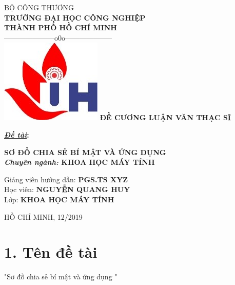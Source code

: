 \documentclass[12pt,a4paper]{report}
\begin{document}
\fontsize{12pt}{18pt}\selectfont
\setlength{\baselineskip}{18truept}
\begin{framed}

	\begin{center}
		{\large BỘ CÔNG THƯƠNG}\\
		{\large\bf TRƯỜNG ĐẠI HỌC CÔNG NGHIỆP \\
			THÀNH PHỐ HỒ CHÍ MINH}\\
	
		{---------------------o0o--------------------}\\[0.5cm]
		\includegraphics{logo}
		\vskip 2cm
		{\bf ĐỀ CƯƠNG LUẬN VĂN THẠC SĨ}\\[1cm]
		\begin{flushleft}
			{\bf {\underline{\textit{Đề tài}}:}}
		\end{flushleft}
	
		\fontsize{20pt}{18pt}\selectfont
		{\Large\bf \textbf{SƠ ĐỒ CHIA SẺ BÍ MẬT VÀ ỨNG DỤNG}}\\
		\vskip 1cm
		\fontsize{14pt}{18pt}\selectfont
		{\bf {\it Chuyên ngành:} KHOA HỌC MÁY TÍNH}
		\vskip 5cm
		\begin{flushleft}
			Giảng viên hướng dẫn: \textbf{PGS.TS XYZ}\\[0.5cm]
			Học viên: \textbf{NGUYỄN QUANG HUY}\\[0.5cm]
			Lớp: \textbf{KHOA HỌC MÁY TÍNH} \\[0.5cm]
		\end{flushleft}	
	
	\fontsize{12pt}{18pt}\selectfont	
	 HỒ CHÍ MINH, 12/2019

	\end{center}
\end{framed}

\section*{1. Tên đề tài}
		"Sơ đồ chia sẻ bí mật và ứng dụng "
\end{document}
